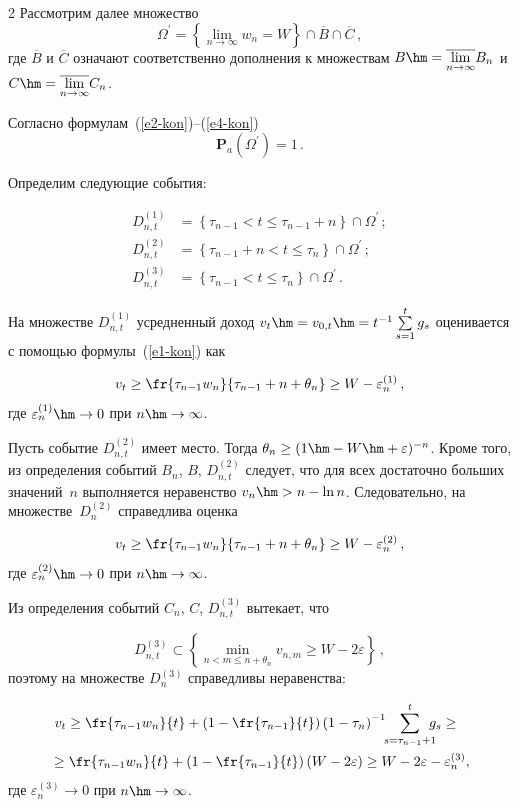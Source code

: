 \begin{multicols}{2}
  Рассмотрим далее множество
  $$
  \Omega^\prime =\left\{ \lim\limits_{n\rightarrow\infty} w_n =W\right\}\cap 
\overline{B}\cap\overline{C}\,,
  $$
где $\overline{B}$ и $\overline{C}$ означают соответственно дополнения к множествам 
$B\hm= \overline{\lim\limits_{n\rightarrow\infty}} B_n$ и $C\hm= 
\overline{\lim\limits_{n\rightarrow\infty}} C_n$.
  
  Согласно формулам~(\ref{e2-kon})--(\ref{e4-kon})
  $$
  \mathbf{P}_{a}\left(\Omega^\prime\right) =1\,.
  $$
  
  Определим следующие события:
  
  \noindent
  \begin{align*}
  D_{n,t}^{(1)} &= \left\{ \tau_{n-1}<t\leq \tau_{n-1}+n\right\} \cap \Omega^\prime\,;\\
  D_{n,t}^{(2)} &= \left\{\tau_{n-1}+n<t\leq \tau_n\right\}\cap \Omega^\prime\,;\\
  D_{n,t}^{(3)} &= \left\{ \tau_{n-1}<t\leq \tau_n\right\} \cap \Omega^\prime\,.
  \end{align*}
  
  На множестве $D_{n,t}^{(1)}$ усредненный доход $v_t\hm=v_{0,t}\hm=
  t^{-1}\sum\limits_{s=1}^t g_s$ оценивается с помощью формулы~(\ref{e1-kon}) как
  
    \noindent
  $$
  v_t\geq \fr{\tau_{n-1} w_n}{\tau_{n-1}+n+\theta_n}\geq W-\varepsilon_n^{(1)}\,,
  $$
где $\varepsilon_n^{(1)}\hm\rightarrow0$ при $n\hm\rightarrow\infty$.
  
  Пусть событие $D_{n,t}^{(2)}$ имеет место. Тогда $\theta_n\geq (1\hm- 
W\hm+\varepsilon)^{-n}$. Кроме того, из определения событий $B_n$, $B$, 
$D_{n,t}^{(2)}$ следует, что для всех достаточно больших значений~$n$ выполняется 
неравенство $v_n\hm> n-\ln n$. Следовательно, на множестве~$D_n^{(2)}$ справедлива 
оценка

  \noindent
  $$
  v_t\geq \fr{\tau_{n-1} w_n}{\tau_{n-1}+n+\theta_n}\geq W-\varepsilon_n^{(2)}\,,
  $$
где $\varepsilon_n^{(2)}\hm\rightarrow0$ при $n\hm\rightarrow\infty$.
  
  Из определения событий $C_n$, $C$, $D_{n,t}^{(3)}$ вытекает, что
  
    \noindent
  $$
  D_{n,t}^{(3)} \subset \left\{ \min\limits_{n<m\leq n+\theta_n} v_{n,m}\geq W-
2\varepsilon\right\}\,,
  $$
поэтому на множестве $D_n^{(3)}$ справедливы неравенства:

  \noindent
\begin{multline*}
\!\!v_t\geq \fr{\tau_{n-1} w_n}{t}+\left(1- \fr{\tau_{n-1}}{t}\right) \left( 1-\tau_n\right)^{-1} 
\!\!\sum\limits_{s=\tau_{n-1}+1}^t \!\!\!\!g_s\geq{}\\
{}\geq \fr{\tau_{n-1} w_n}{t}+\left( 1-\fr{\tau_{n-1}}{t}\right)\left( W-2\varepsilon\right) \geq 
W-2\varepsilon -\varepsilon_n^{(3)},
\end{multline*}
где $\varepsilon_n^{(3)}\rightarrow0$ при $n\hm\rightarrow\infty$.


\end{multicols}
